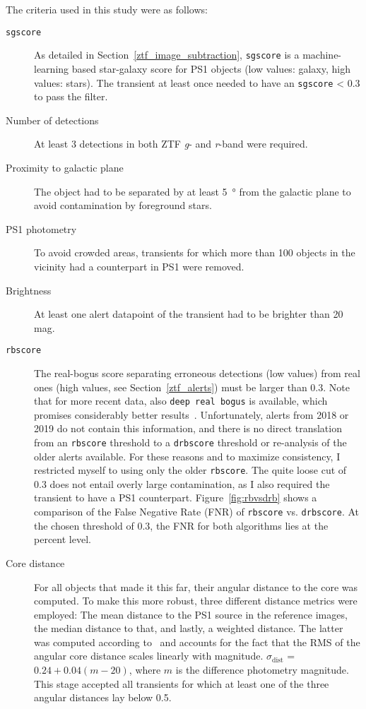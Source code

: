 The criteria used in this study were as follows:
\begin{description}
  \item[\texttt{sgscore}] As detailed in Section~\ref{ztf_image_subtraction}, \texttt{sgscore} is a machine-learning based star-galaxy score for PS1 objects (low values: galaxy, high values: stars). The transient at least once needed to have an \texttt{sgscore} < 0.3 to pass the filter.
  \item[Number of detections] At least 3 detections in both ZTF \textit{g}- and \textit{r}-band were required.
  \item[Proximity to galactic plane] The object had to be separated by at least \SI{5}{\degree} from the galactic plane to avoid contamination by foreground stars.
  \item[PS1 photometry] To avoid crowded areas, transients for which more than 100 objects in the vicinity had a counterpart in PS1 were removed.
  \item[Brightness] At least one alert datapoint of the transient had to be brighter than 20 mag.
  \item[\texttt{rbscore}] The real-bogus score separating erroneous detections (low values) from real ones (high values, see Section~\ref{ztf_alerts}) must be larger than 0.3. Note that for more recent data, also \texttt{deep real bogus} is available, which promises considerably better results~. Unfortunately, alerts from 2018 or 2019 do not contain this information, and there is no direct translation from an \texttt{rbscore} threshold to a \texttt{drbscore} threshold or re-analysis of the older alerts available. For these reasons and to maximize consistency, I restricted myself to using only the older \texttt{rbscore}. The quite loose cut of 0.3 does not entail overly large contamination, as I also required the transient to have a PS1 counterpart. Figure~\ref{fig:rbvsdrb} shows a comparison of the False Negative Rate (FNR) of \texttt{rbscore} vs. \texttt{drbscore}. At the chosen threshold of $0.3$, the FNR for both algorithms lies at the percent level.
  \item[Core distance] For all objects that made it this far, their angular distance to the core was computed. To make this more robust, three different distance metrics were employed: The mean distance to the PS1 source in the reference images, the median distance to that, and lastly, a weighted distance. The latter was computed according to~ and accounts for the fact that the RMS of the angular core distance scales linearly with magnitude. $\sigma_\text{dist}$ = $0.24 + 0.04(m-20)$, where $m$ is the difference photometry magnitude. This stage accepted all transients for which at least one of the three angular distances lay below \SI{0.5}{\arcsec}.
\end{description}

